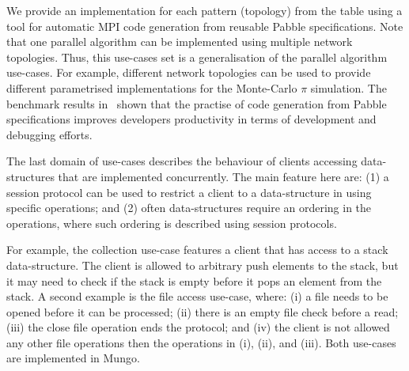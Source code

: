 We provide an implementation for each pattern (topology) from the table using a tool for automatic MPI code generation
from reusable Pabble specifications. Note that one parallel algorithm can be implemented using multiple network topologies.
Thus, this use-cases set is a generalisation of the parallel algorithm use-cases.
For example, different network topologies can be used to provide
different parametrised implementations for the Monte-Carlo $\pi$ simulation.
The benchmark results in~\cite{NCY2015} shown that the practise
of code generation from Pabble specifications improves developers
productivity in terms of development and debugging efforts.


The last domain of use-cases describes the behaviour of
clients accessing data-structures that are implemented
concurrently. The main feature here are:
(1) a session protocol can be used to restrict
a client to a data-structure in using specific operations; and
(2) often data-structures require an ordering in the
operations, where such ordering is described using session protocols.

For example, the collection use-case features a client
that has access to a stack data-structure. The client
is allowed to arbitrary push elements to the stack, but
it may need to check if the stack is empty before it
pops an element from the stack.
A second example is the file access use-case, where:
(i) a file needs to be opened before it can be processed;
(ii) there is an empty file check before a read;
(iii) the close file operation ends the protocol; and
(iv) the client is not allowed any other file operations then
the operations in (i), (ii), and (iii).
Both use-cases are implemented in Mungo.

